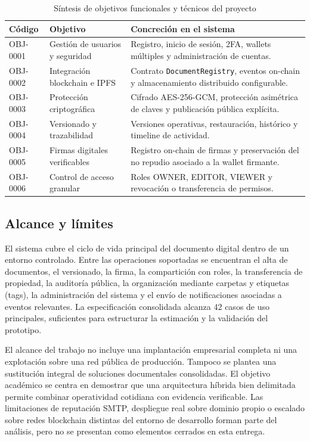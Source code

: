 \documentclass[11pt, a4paper]{article}
\begin{document}
\begin{table}[H]
    \centering
    \small
    \begin{tabular}{|p{3.1cm}|p{4.2cm}|p{5.7cm}|}
    \hline
    \textbf{Código} & \textbf{Objetivo} & \textbf{Concreción en el sistema} \\
    \hline
    OBJ-0001 & Gestión de usuarios y seguridad & Registro, inicio de sesión, 2FA, wallets múltiples y administración de cuentas. \\
    \hline
    OBJ-0002 & Integración blockchain e IPFS & Contrato \texttt{DocumentRegistry}, eventos on-chain y almacenamiento distribuido configurable. \\
    \hline
    OBJ-0003 & Protección criptográfica & Cifrado AES-256-GCM, protección asimétrica de claves y publicación pública explícita. \\
    \hline
    OBJ-0004 & Versionado y trazabilidad & Versiones operativas, restauración, histórico y timeline de actividad. \\
    \hline
    OBJ-0005 & Firmas digitales verificables & Registro on-chain de firmas y preservación del no repudio asociado a la wallet firmante. \\
    \hline
    OBJ-0006 & Control de acceso granular & Roles OWNER, EDITOR, VIEWER y revocación o transferencia de permisos. \\
    \hline
    \end{tabular}
    \caption{Síntesis de objetivos funcionales y técnicos del proyecto}
    \label{tab:objetivos-principales}
\end{table}

\subsection{Alcance y límites}

El sistema cubre el ciclo de vida principal del documento digital dentro de un entorno controlado. Entre las operaciones soportadas se encuentran el alta de documentos, el versionado, la firma, la compartición con roles, la transferencia de propiedad, la auditoría pública, la organización mediante carpetas y etiquetas (tags), la administración del sistema y el envío de notificaciones asociadas a eventos relevantes. La especificación consolidada alcanza 42 casos de uso principales, suficientes para estructurar la estimación y la validación del prototipo.

El alcance del trabajo no incluye una implantación empresarial completa ni una explotación sobre una red pública de producción. Tampoco se plantea una sustitución integral de soluciones documentales consolidadas. El objetivo académico se centra en demostrar que una arquitectura híbrida bien delimitada permite combinar operatividad cotidiana con evidencia verificable. Las limitaciones de reputación SMTP, despliegue real sobre dominio propio o escalado sobre redes blockchain distintas del entorno de desarrollo forman parte del análisis, pero no se presentan como elementos cerrados en esta entrega.
\end{document}
